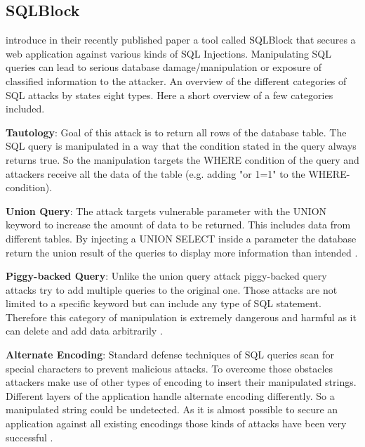 \subsection{SQLBlock}
\textcite[]{Jahanshahi2018} introduce in their recently published paper a tool called SQLBlock that secures a web application against various kinds of SQL Injections. Manipulating SQL queries can lead to serious database damage/manipulation or exposure of classified information to the attacker. An overview of the different categories of SQL attacks by \textcite[3ff.]{Halfond2008} states eight types. Here a short overview of a few categories included.\newline


\noindent \textbf{Tautology}: Goal of this attack is to return all rows of the database table. The SQL query is manipulated in a way that the condition stated in the query always returns true. So the manipulation targets the WHERE condition of the query and attackers receive all the data of the table (e.g. adding "or 1=1" to the WHERE-condition)\autocite[3]{Halfond2008}.\newline


\noindent\textbf{Union Query}: The attack targets vulnerable parameter with the UNION keyword to increase the amount of data to be returned. This includes data from different tables. By injecting a UNION SELECT inside a parameter the database return the union result of the queries to display more information than intended \autocite[4]{Halfond2008}.\newline


\noindent\textbf{Piggy-backed Query}: Unlike the union query attack piggy-backed query attacks try to add multiple queries to the original one. Those attacks are not limited to a specific keyword but can include any type of SQL statement. Therefore this category of manipulation is extremely dangerous and harmful as it can delete and add data arbitrarily \autocite[4]{Halfond2008}.\newline


\noindent\textbf{Alternate Encoding}: Standard defense techniques of SQL queries scan for special characters to prevent malicious attacks. To overcome those obstacles attackers make use of other types of encoding to insert their manipulated strings. Different layers of the application handle alternate encoding differently. So a manipulated string could be undetected. As it is almost possible to secure an application against all existing encodings those kinds of attacks have been very successful \autocite[5]{Halfond2008}.\newline

